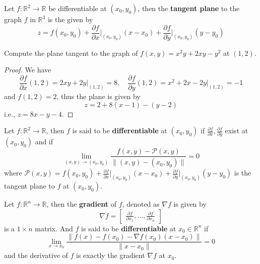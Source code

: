 \documentclass[openany]{book}
\newcommand{\R}{\mathbb{R}}
\begin{document}
\begin{defn}
    Let $f:\R^2\to\R$ be differentiable at $(x_0,y_0)$, then the \textbf{tangent plane} to the graph $f$ in $\R^3$ is the given by 
    \begin{equation*}
        z=f(x_0,y_0)+\frac{\partial f}{\partial x}\bigg\vert_{(x_0,y_0)}(x-x_0)+\frac{\partial f}{\partial y}\bigg\vert_{(x_0,y_0)}(y-y_0)
    \end{equation*}
\end{defn}

\begin{prob}
    Compute the plane tangent to the graph of $f(x,y)=x^2y+2xy-y^2$ at $(1,2)$.
\end{prob}
\begin{proof}
    We have 
    \begin{equation*}
        \frac{\partial f}{\partial x}(1,2)=2xy+2y\vert_{(1,2)}=8, \quad \frac{\partial f}{\partial y}(1,2)=x^2+2x-2y\vert_{(1,2)}=-1
    \end{equation*}
    and $f(1,2)=2$, thus the plane is given by
    \begin{equation*}
        z=2+8(x-1)-(y-2)
    \end{equation*}
    i.e., $z=8x-y-4$.
\end{proof}

\begin{defn}
    Let $f:\R^2\to\R$, then $f$ is said to be \textbf{differentiable} at $(x_0,y_0)$ if $\frac{\partial f}{\partial x}, \frac{\partial f}{\partial y}$ exist at $(x_0,y_0)$ and if 
    \begin{equation*}
        \lim_{(x,y)\to(x_0,y_0)}\frac{f(x,y)-\mathcal{P}(x,y)}{\|(x,y)-(x_0,y_0)\|}=0
    \end{equation*}
    where $\mathcal{P}(x,y)=f(x_0,y_0)+\frac{\partial f}{\partial x}\bigg\vert_{(x_0,y_0)}(x-x_0)+\frac{\partial f}{\partial y}\bigg\vert_{(x_0,y_0)}(y-y_0)$ is the tangent plane to $f$ at $(x_0,y_0)$.
\end{defn}


\begin{defn}
    Let $f:\R^n\to\R$, then the \textbf{gradient} of $f$, denoted as $\nabla f$ is given by 
    \begin{equation*}
        \nabla f=\begin{bmatrix}
            \frac{\partial f}{\partial x_1}, \dots, \frac{\partial f}{\partial x_n}
        \end{bmatrix}
    \end{equation*}
    is a $1\times n$ matrix. And $f$ is said to be \textbf{differentiable} at $x_0\in\R^n$ if 
    \begin{equation*}
        \lim_{x\to x_0}\frac{\|f(x)-f(x_0)-\nabla f(x_0)(x-x_0)\|}{\|x-x_0\|}=0
    \end{equation*}
    and the derivative of $f$ is exactly the gradient $\nabla f$ at $x_0$.
\end{defn}
\end{document}
